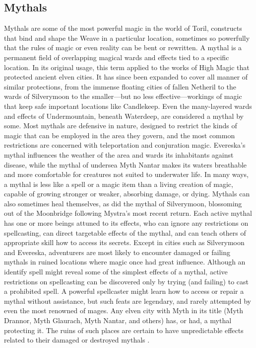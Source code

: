 \documentclass[10pt,a4paper,twoside,twocolumn,openany,bg=print,nodeprecatedcode]{dndbook}
\begin{document}
\subsection{Mythals}
Mythals are some of the most powerful magic in the world of Toril, constructs that bind and shape the Weave  in a particular location, sometimes so powerfully that the rules of magic or even reality can be bent or rewritten.
A mythal is a permanent field of overlapping magical wards and effects tied to a specific location. In its original usage, this term applied to the works of High Magic that protected ancient elven cities. It has since been expanded to cover all manner of similar protections, from the immense floating cities of fallen Netheril to the wards of Silverymoon to the smaller—but no less effective—workings of magic that keep safe important locations like Candlekeep. Even the many-layered wards and effects of Undermountain, beneath Waterdeep, are considered a mythal by some.
Most mythals are defensive in nature, designed to restrict the kinds of magic that can be employed in the area they govern, and the most common restrictions are concerned with teleportation and conjuration magic. Evereska's mythal influences the weather of the area and wards its inhabitants against disease, while the mythal of undersea Myth Nantar makes its waters breathable and more comfortable for creatures not suited to underwater life.
In many ways, a mythal is less like a spell or a magic item than a living creation of magic, capable of growing stronger or weaker, absorbing damage, or dying. Mythals can also sometimes heal themselves, as did the mythal of Silverymoon, blossoming out of the Moonbridge following Mystra's most recent return. Each active mythal has one or more beings attuned to its effects, who can ignore any restrictions on spellcasting, can direct targetable effects of the mythal, and can teach others of appropriate skill how to access its secrets.
Except in cities such as Silverymoon and Evereska, adventurers are most likely to encounter damaged or failing mythals in ruined locations where magic once had great influence. Although an identify spell might reveal some of the simplest effects of a mythal, active restrictions on spellcasting can be discovered only by trying (and failing) to cast a prohibited spell. A powerful spellcaster might learn how to access or repair a mythal without assistance, but such feats are legendary, and rarely attempted by even the most renowned of mages. Any elven city with Myth in its title (Myth Drannor, Myth Glaurach, Myth Nantar, and others) has, or had, a mythal protecting it. The ruins of such places are certain to have unpredictable effects related to their damaged or destroyed mythals .
\end{document}
